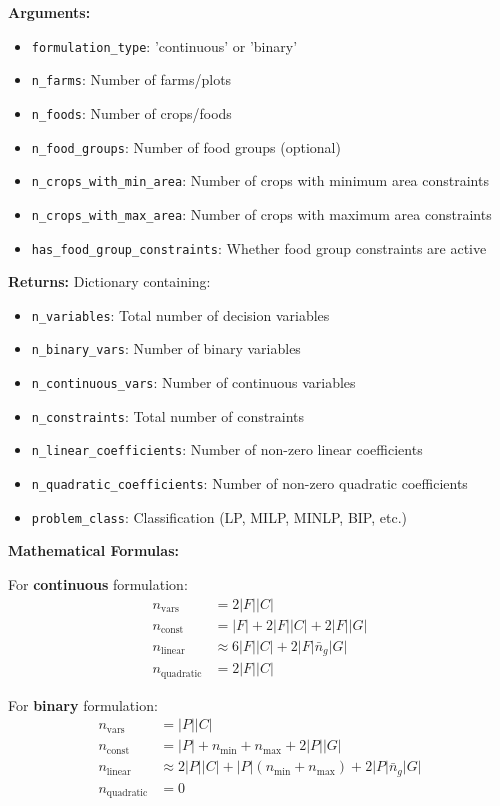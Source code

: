 \documentclass{article}
\begin{document}
\textbf{Arguments:}
\begin{itemize}
    \item \texttt{formulation\_type}: 'continuous' or 'binary'
    \item \texttt{n\_farms}: Number of farms/plots
    \item \texttt{n\_foods}: Number of crops/foods
    \item \texttt{n\_food\_groups}: Number of food groups (optional)
    \item \texttt{n\_crops\_with\_min\_area}: Number of crops with minimum area constraints
    \item \texttt{n\_crops\_with\_max\_area}: Number of crops with maximum area constraints
    \item \texttt{has\_food\_group\_constraints}: Whether food group constraints are active
\end{itemize}

\textbf{Returns:} Dictionary containing:
\begin{itemize}
    \item \texttt{n\_variables}: Total number of decision variables
    \item \texttt{n\_binary\_vars}: Number of binary variables
    \item \texttt{n\_continuous\_vars}: Number of continuous variables
    \item \texttt{n\_constraints}: Total number of constraints
    \item \texttt{n\_linear\_coefficients}: Number of non-zero linear coefficients
    \item \texttt{n\_quadratic\_coefficients}: Number of non-zero quadratic coefficients
    \item \texttt{problem\_class}: Classification (LP, MILP, MINLP, BIP, etc.)
\end{itemize}

\textbf{Mathematical Formulas:}

For \textbf{continuous} formulation:
\begin{align*}
n_{\text{vars}} &= 2|F||C| \\
n_{\text{const}} &= |F| + 2|F||C| + 2|F||G| \\
n_{\text{linear}} &\approx 6|F||C| + 2|F|\bar{n}_g|G| \\
n_{\text{quadratic}} &= 2|F||C|
\end{align*}

For \textbf{binary} formulation:
\begin{align*}
n_{\text{vars}} &= |P||C| \\
n_{\text{const}} &= |P| + n_{\min} + n_{\max} + 2|P||G| \\
n_{\text{linear}} &\approx 2|P||C| + |P|(n_{\min} + n_{\max}) + 2|P|\bar{n}_g|G| \\
n_{\text{quadratic}} &= 0
\end{align*}
\end{document}
